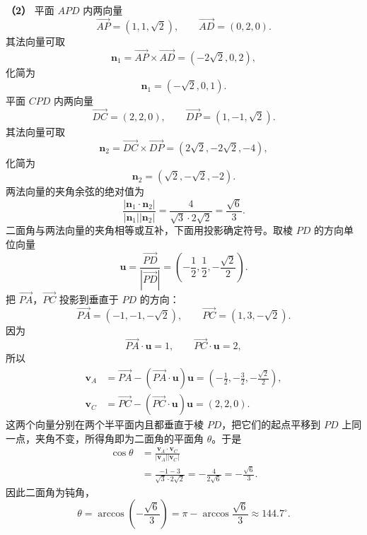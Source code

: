\begin{answer}
\textbf{（2）} 平面 $APD$ 内两向量
\nopagebreak[4]
\[\overrightarrow{AP}=(1,1,\sqrt2),\qquad
\overrightarrow{AD}=(0,2,0).\]
其法向量可取
\nopagebreak[4]
\[\boldsymbol n_1=\overrightarrow{AP}\times\overrightarrow{AD}
=(-2\sqrt2,0,2),\]
化简为
\nopagebreak[4]
\[\boldsymbol n_1=(-\sqrt2,0,1).\]
平面 $CPD$ 内两向量
\nopagebreak[4]
\[\overrightarrow{DC}=(2,2,0),\qquad
\overrightarrow{DP}=(1,-1,\sqrt2).\]
其法向量可取
\nopagebreak[4]
\[\boldsymbol n_2=\overrightarrow{DC}\times\overrightarrow{DP}
=(2\sqrt2,-2\sqrt2,-4),\]
化简为
\nopagebreak[4]
\[\boldsymbol n_2=(\sqrt2,-\sqrt2,-2).\]
两法向量的夹角余弦的绝对值为
\nopagebreak[4]
\[\frac{|\boldsymbol n_1\cdot\boldsymbol n_2|}{|\boldsymbol n_1||\boldsymbol n_2|}
=\frac{4}{\sqrt3\cdot2\sqrt2}
=\frac{\sqrt6}{3}.\]
二面角与两法向量的夹角相等或互补，下面用投影确定符号。取棱 $PD$ 的方向单位向量
\nopagebreak[4]
\[\boldsymbol u=\frac{\overrightarrow{PD}}{|\overrightarrow{PD}|}
=\left(-\frac12,\frac12,-\frac{\sqrt2}{2}\right).\]
把 $\overrightarrow{PA}$，$\overrightarrow{PC}$ 投影到垂直于 $PD$ 的方向：
\nopagebreak[4]
\[\overrightarrow{PA}=(-1,-1,-\sqrt2),\qquad
\overrightarrow{PC}=(1,3,-\sqrt2).\]
因为
\nopagebreak[4]
\[\overrightarrow{PA}\cdot\boldsymbol u=1,\qquad
\overrightarrow{PC}\cdot\boldsymbol u=2,\]
所以
\nopagebreak[4]
\[\begin{aligned}
\boldsymbol v_A&=\overrightarrow{PA}-(\overrightarrow{PA}\cdot\boldsymbol u)\boldsymbol u
=\left(-\frac12,-\frac32,-\frac{\sqrt2}{2}\right),\\
\boldsymbol v_C&=\overrightarrow{PC}-(\overrightarrow{PC}\cdot\boldsymbol u)\boldsymbol u
=(2,2,0).
\end{aligned}\]
这两个向量分别在两个半平面内且都垂直于棱 $PD$，把它们的起点平移到 $PD$ 上同一点，夹角不变，所得角即为二面角的平面角 $\theta$。于是
\nopagebreak[4]
\[\begin{aligned}
\cos\theta
&=\frac{\boldsymbol v_A\cdot\boldsymbol v_C}{|\boldsymbol v_A||\boldsymbol v_C|}\\
&=\frac{-1-3}{\sqrt3\cdot2\sqrt2}
=-\frac{4}{2\sqrt6}
=-\frac{\sqrt6}{3}.
\end{aligned}\]
因此二面角为钝角，
\nopagebreak[4]
\[\theta=\arccos\left(-\frac{\sqrt6}{3}\right)
=\pi-\arccos\frac{\sqrt6}{3}
\approx144.7^\circ.\]



\end{answer}
